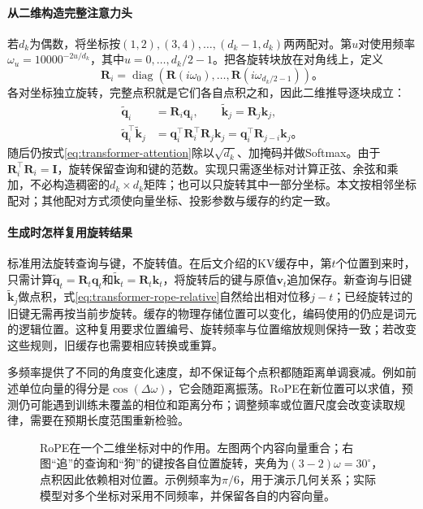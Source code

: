 \paragraph{从二维构造完整注意力头}
若$d_k$为偶数，将坐标按$(1,2),(3,4),\ldots,(d_k-1,d_k)$两两配对。第$u$对使用频率$\omega_u=10000^{-2u/d_k}$，其中$u=0,\ldots,d_k/2-1$。把各旋转块放在对角线上，定义
\[
  \bm R_i=\operatorname{diag}\!\left(
    \bm R(i\omega_0),\ldots,\bm R(i\omega_{d_k/2-1})\right)\text{。}
\]
各对坐标独立旋转，完整点积就是它们各自点积之和，因此二维推导逐块成立：
\begin{equation}
  \begin{aligned}
    \widetilde{\bm q}_i&=\bm R_i\bm q_i,\qquad
    \widetilde{\bm k}_j=\bm R_j\bm k_j,\\
    \widetilde{\bm q}_i^{\top}\widetilde{\bm k}_j
      &=\bm q_i^{\top}\bm R_i^{\top}\bm R_j\bm k_j
       =\bm q_i^{\top}\bm R_{j-i}\bm k_j\text{。}
  \end{aligned}
  \label{eq:transformer-rope-relative}
\end{equation}
随后仍按式\eqref{eq:transformer-attention}除以$\sqrt{d_k}$、加掩码并做Softmax。由于$\bm R_i^{\top}\bm R_i=\bm I$，旋转保留查询和键的范数。实现只需逐坐标对计算正弦、余弦和乘加，不必构造稠密的$d_k\times d_k$矩阵；也可以只旋转其中一部分坐标。本文按相邻坐标配对；其他配对方式须使向量坐标、投影参数与缓存的约定一致。

\paragraph{生成时怎样复用旋转结果}
标准用法旋转查询与键，不旋转值。在后文介绍的KV缓存中，第$t$个位置到来时，只需计算$\widetilde{\bm q}_t=\bm R_t\bm q_t$和$\widetilde{\bm k}_t=\bm R_t\bm k_t$，将旋转后的键与原值$\bm v_t$追加保存。新查询与旧键$\widetilde{\bm k}_j$做点积，式\eqref{eq:transformer-rope-relative}自然给出相对位移$j-t$；已经旋转过的旧键无需再按当前步旋转。缓存的物理存储位置可以变化，编码使用的仍应是词元的逻辑位置。这种复用要求位置编号、旋转频率与位置缩放规则保持一致；若改变这些规则，旧缓存也需要相应转换或重算。

多频率提供了不同的角度变化速度，却不保证每个点积都随距离单调衰减。例如前述单位向量的得分是$\cos(\Delta\omega)$，它会随距离振荡。RoPE在新位置可以求值，预测仍可能遇到训练未覆盖的相位和距离分布；调整频率或位置尺度会改变读取规律，需要在预期长度范围重新检验。

\begin{figure}[htbp]
  \centering
  
  \caption{RoPE在一个二维坐标对中的作用。左图两个内容向量重合；右图“追”的查询和“狗”的键按各自位置旋转，夹角为$(3-2)\omega=30^\circ$，点积因此依赖相对位置。示例频率为$\pi/6$，用于演示几何关系；实际模型对多个坐标对采用不同频率，并保留各自的内容向量。}
  \label{fig:transformer-rope}
\end{figure}
\FloatBarrier

